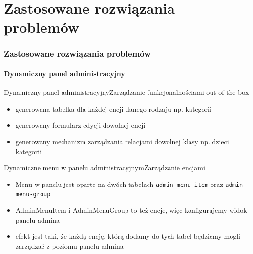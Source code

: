 \documentclass[polish,xcolor=table,9pt,aspectratio=1610,hyperref={pdfpagemode=FullScreen}]{beamer}
\begin{document}
\part{Zastosowane rozwiązania problemów}

\section{Zastosowane rozwiązania problemów}

\subsection{Dynamiczny panel administracyjny}

\begin{frame}{Dynamiczny panel administracyjny}{Zarządzanie funkcjonalnościami out-of-the-box}
	\begin{itemize}
		\item<1-> generowana tabelka dla każdej encji danego rodzaju np. kategorii 
		\item<2-> generowany formularz edycji dowolnej encji
		\item<3-> generowany mechanizm zarządzania relacjami dowolnej klasy np. dzieci kategorii
	\end{itemize}
	
\end{frame}

\begin{frame}{Dynamiczne menu w panelu administracyjnym}{Zarządzanie encjami}
\begin{itemize}
	\begin{exampleblock}{Przykład}
		Dodajemy nową klasę do systemu opartego na frameworku, chcemy mieć możliwość zarządzania tą klasą (operacje CRUD). Aby system widział tę klasę (i wszystkie ją rozszerzające) należy dodać rekord do tabeli \texttt{admin-menu-item} z nazwą klasy nowej encji. W ten sposób powstały wszystkie funkcjonalności \textit{out-of-the-box} 
	\end{exampleblock}
	\item<1-> Menu w panelu jest oparte na dwóch tabelach \texttt{admin-menu-item} oraz \texttt{admin-menu-group}
	\item<2-> AdminMenuItem i AdminMenuGroup to też encje, więc konfigurujemy widok panelu admina
	\item<3-> efekt jest taki, że każdą encję, którą dodamy do tych tabel będziemy mogli zarządzać z poziomu panelu admina
\end{itemize}
\end{frame}
\end{document}
